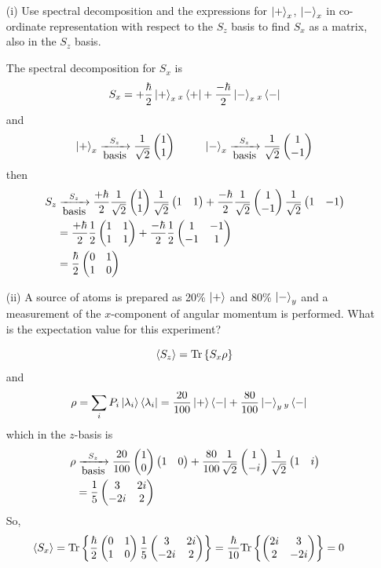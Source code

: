 \documentclass[english, 11pt]{article}
\begin{document}
      \begin{exmp}
        \begin{itemize}
          \item[(i)] Use spectral decomposition and the expressions for $\left|+\right\rangle_x$, $\left|-\right\rangle_x$ in co-ordinate representation with respect to the $S_z$ basis to find $S_x$ as a matrix, also in the $S_z$ basis.\newline

          The spectral decomposition for $S_x$ is
          \[ S_x = +\frac{\hbar}{2}\left|+\right\rangle_x{}_x\left\langle+\right| + \frac{-\hbar}{2}\left|-\right\rangle_x{}_x\left\langle-\right| \]
          and
          \[ \left|+\right\rangle_x \xrightarrow[\mbox{basis}]{S_z} \frac{1}{\sqrt{2}}\left(\begin{matrix}1 \\ 1\end{matrix}\right) \ \ \ \ \ \ \ \ \left|-\right\rangle_x \xrightarrow[\mbox{basis}]{S_z} \frac{1}{\sqrt{2}}\left(\begin{matrix}1 \\ -1\end{matrix}\right) \]
          then
          \begin{align*}
            S_z & \xrightarrow[\mbox{basis}]{S_z} \frac{+\hbar}{2}\frac{1}{\sqrt{2}}\left(\begin{matrix}1 \\ 1\end{matrix}\right)\frac{1}{\sqrt{2}}\left(\begin{matrix}1 & 1\end{matrix}\right) + \frac{-\hbar}{2}\frac{1}{\sqrt{2}}\left(\begin{matrix}1 \\ -1\end{matrix}\right)\frac{1}{\sqrt{2}}\left(\begin{matrix}1 & -1\end{matrix}\right)\\
            & = \frac{+\hbar}{2}\frac{1}{2}\left(\begin{matrix}1 & 1 \\ 1 & 1\end{matrix}\right) + \frac{-\hbar}{2}\frac{1}{2}\left(\begin{matrix}1 & -1 \\ -1 & 1\end{matrix}\right) \\
            & = \frac{\hbar}{2} \left(\begin{matrix}0 & 1 \\ 1 & 0\end{matrix}\right)
          \end{align*}
          \item[(ii)] A source of atoms is prepared as 20\% $\left|+\right\rangle$ and 80\% $\left|-\right\rangle_y$ and a measurement of the $x$-component of angular momentum is performed. What is the expectation value for this experiment?\newline

          \[ \langle S_z \rangle = \mbox{Tr}\left\{ S_x\rho \right\} \]
          and
          \begin{align*}
            \rho & = \sum_i P_i \left|\lambda_i\right\rangle\left\langle\lambda_i\right| = \frac{20}{100}\left|+\right\rangle\left\langle-\right| + \frac{80}{100}\left|-\right\rangle_y{}_y\left\langle-\right|
          \end{align*}
          which in the $z$-basis is
          \begin{align*}
            \rho & \xrightarrow[\mbox{basis}]{S_z} \frac{20}{100}\left(\begin{matrix}1 \\ 0\end{matrix}\right)\left(\begin{matrix}1 & 0\end{matrix}\right) + \frac{80}{100}\frac{1}{\sqrt{2}}\left(\begin{matrix}1 \\ -i\end{matrix}\right) \frac{1}{\sqrt{2}}\left(\begin{matrix}1 & i\end{matrix}\right) \\
            & = \frac{1}{5}\left(\begin{matrix}3 & 2i \\ -2i & 2\end{matrix}\right)
          \end{align*}
          So,
          \begin{align*}
            \langle S_x \rangle & = \mbox{Tr}\left\{ \frac{\hbar}{2}\left(\begin{matrix}0 & 1 \\ 1 & 0\end{matrix}\right)\frac{1}{5}\left(\begin{matrix}3 & 2i \\ -2i & 2\end{matrix}\right) \right\} = \frac{\hbar}{10}\mbox{Tr}\left\{ \left(\begin{matrix}2i & 3 \\ 2 & -2i\end{matrix}\right) \right\} = 0
          \end{align*}
        \end{itemize}
      \end{exmp}
\end{document}
